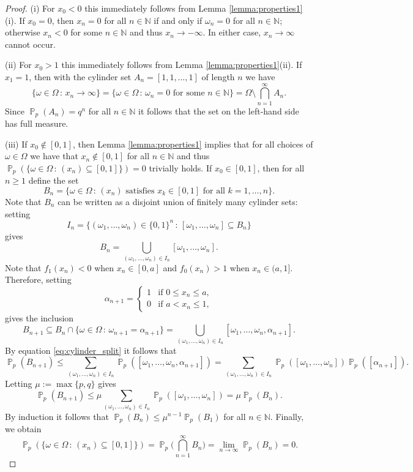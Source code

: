 \documentclass[a4paper,12pt]{article}
\DeclareMathOperator{\prob}{\mathbb{P}}
\begin{document}
\begin{proof}
(i) For $x_0 < 0$ this immediately follows from Lemma \ref{lemma:properties1}(i). If $x_0 = 0$, then $x_n = 0$ for all $n \in \mathbb{N}$ if and only if $\omega_n = 0$ for all $n \in \mathbb{N}$; otherwise $x_n < 0$ for some $n \in \mathbb{N}$ and thus $x_n \to -\infty$. In either case, $x_n \to \infty$ cannot occur. 

(ii) For $x_0 > 1$ this immediately follows from Lemma \ref{lemma:properties1}(ii). If $x_1 = 1$, then with the cylinder set $A_n = [1,1,\dots,1]$ of length $n$ we have
\[
\{\omega \in \Omega \,:\, x_n \to \infty\}
	= \{\omega \in \Omega \,:\, \omega_n = 0 \text{ for some } n \in \mathbb{N}\}
	= \Omega \setminus \bigcap_{n=1}^\infty A_n.
\]
Since $\prob_p(A_n) = q^n$ for all $n \in \mathbb{N}$ it follows that the set on the left-hand side has full measure.

(iii) If $x_0 \notin [0,1]$, then Lemma \ref{lemma:properties1} implies that for all choices of $\omega \in \Omega$ we have that $x_n \notin [0,1]$ for all $n \in \mathbb{N}$ and thus $\prob_p(\{\omega \in \Omega \,:\, (x_n) \subseteq [0,1]\}) = 0$ trivially holds. If $x_0 \in [0,1]$, then for all $n \geq 1$ define the set
\[
B_n = \{\omega \in \Omega \,:\, (x_n) \text{ satisfies } x_k \in [0,1] \text{ for all } k=1,\dots,n\}.
\]
Note that $B_n$ can be written as a disjoint union of finitely many cylinder sets: setting
\[
I_n = \{(\omega_1,\dots,\omega_n) \in \{0,1\}^n \,:\, [\omega_1,\dots,\omega_n] \subseteq B_n\}
\]
gives
\[
B_n = \bigcup_{(\omega_1,\dots,\omega_n) \in I_n} [\omega_1,\dots,\omega_n].
\]
Note that $f_1(x_n)<0$ when $x_n \in [0,a]$ and $f_0(x_n)>1$ when $x_n \in (a,1]$. Therefore, setting
\[
\alpha_{n+1} = \begin{cases} 1 & \text{if } 0 \leq x_n \leq a, \\ 0 & \text{if } a < x_n \leq 1, \end{cases}
\]
gives the inclusion
\[
B_{n+1}
	\subseteq B_n \cap \{\omega \in \Omega \,:\, \omega_{n+1} = \alpha_{n+1}\}
	= \bigcup_{(\omega_1,\dots,\omega_n) \in I_n} [\omega_1,\dots,\omega_n, \alpha_{n+1}].
\]
By equation \eqref{eq:cylinder_split} it follows that
\[
\prob_p(B_{n+1})
	\leq \sum_{(\omega_1,\dots,\omega_n) \in I_n} \prob_p([\omega_1,\dots,\omega_n, \alpha_{n+1}])
	= \sum_{(\omega_1,\dots,\omega_n) \in I_n} \prob_p([\omega_1,\dots,\omega_n])\prob_p([\alpha_{n+1}]).
\]
Letting $\mu := \max\{p,q\}$ gives
\[
\prob_p(B_{n+1}) \leq \mu \sum_{(\omega_1,\dots,\omega_n) \in I_n} \prob_p([\omega_1,\dots,\omega_n]) = \mu\prob_p(B_n).
\]
By induction it follows that $\prob_p(B_n) \leq \mu^{n-1}\prob_p(B_1)$ for all $n \in \mathbb{N}$.
Finally, we obtain
\[
\prob_p(\{ \omega \in \Omega \,:\, (x_n) \subseteq [0,1]\})
	= \prob_p\bigg(\bigcap_{n=1}^\infty B_n\bigg)
	= \lim_{n\to\infty} \prob_p(B_n) = 0.
\]


\end{proof}
\end{document}
